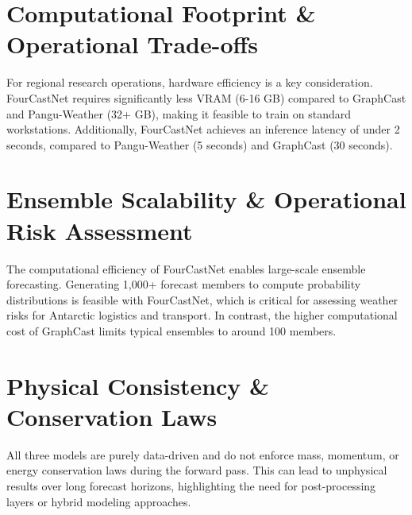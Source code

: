 \documentclass[12pt,titlepage,a4paper]{report}
\begin{document}
\section{Computational Footprint \& Operational Trade-offs}
For regional research operations, hardware efficiency is a key consideration. FourCastNet requires significantly less VRAM (6-16 GB) compared to GraphCast and Pangu-Weather (32+ GB), making it feasible to train on standard workstations. Additionally, FourCastNet achieves an inference latency of under 2 seconds, compared to Pangu-Weather (5 seconds) and GraphCast (30 seconds).

\section{Ensemble Scalability \& Operational Risk Assessment}
The computational efficiency of FourCastNet enables large-scale ensemble forecasting. Generating 1,000+ forecast members to compute probability distributions is feasible with FourCastNet, which is critical for assessing weather risks for Antarctic logistics and transport. In contrast, the higher computational cost of GraphCast limits typical ensembles to around 100 members.

\section{Physical Consistency \& Conservation Laws}
All three models are purely data-driven and do not enforce mass, momentum, or energy conservation laws during the forward pass. This can lead to unphysical results over long forecast horizons, highlighting the need for post-processing layers or hybrid modeling approaches.
\end{document}
